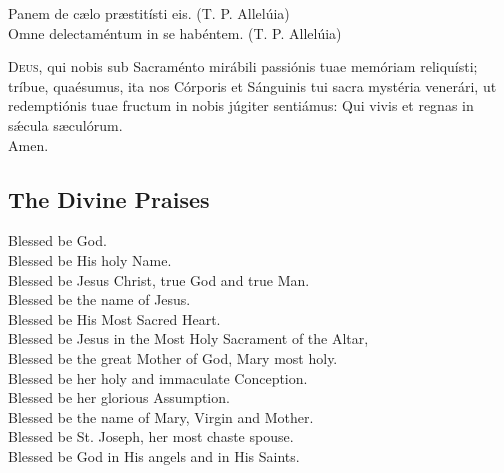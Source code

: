 \documentclass[statementpaper, 11pt]{memoir}
\begin{document}
\vbar Panem de c\ae lo pr\ae stit\'isti eis. (T. P. Allel\'uia)\\
\rbar Omne delectam\'entum in se hab\'entem. (T. P. Allel\'uia)


\lettrine{D}{eus,} qui nobis sub Sacraménto mirábili passiónis tuae memóriam
reliquísti; tríbue, quaésumus, ita nos Córporis et Sánguinis tui sacra mystéria
venerári, ut redemptiónis tuae fructum in nobis júgiter sentiámus: Qui vivis et
regnas in s\'\ae cula s\ae cul\'orum.\\
\rbar Amen.

\subsection{The Divine Praises}

Blessed be God.\\
Blessed be His holy Name.\\
Blessed be Jesus Christ, true God and true Man.\\
Blessed be the name of Jesus.\\
Blessed be His Most Sacred Heart.\\
Blessed be Jesus in the Most Holy Sacrament of the Altar,\\
Blessed be the great Mother of God, Mary most holy.\\
Blessed be her holy and immaculate Conception.\\
Blessed be her glorious Assumption.\\
Blessed be the name of Mary, Virgin and Mother.\\
Blessed be St. Joseph, her most chaste spouse.\\
Blessed be God in His angels and in His Saints.\\
    
\end{document}
